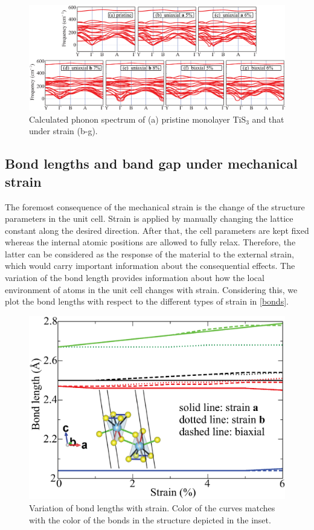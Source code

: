 \begin{landscape}
\begin{figure}[htb]
\centering
\includegraphics[width=\linewidth]{Mob_phn.eps}
\caption{Calculated phonon spectrum of (a) pristine monolayer TiS$_3$ and that under strain (b-g). }
\label{phn}
\end{figure}
\end{landscape}

\subsection{Bond lengths and band gap under mechanical strain}
The foremost consequence of the mechanical strain is the change of the structure parameters in the unit cell. Strain is applied by manually changing the lattice constant along the desired direction. After that, the cell parameters are kept fixed whereas the internal atomic positions are allowed to fully relax. Therefore, the latter can be considered as the response of the material to the external strain, which would carry important information about the consequential effects. The variation of the bond length provides information about how the local environment of atoms in the unit cell changes with strain. Considering this, we plot the bond lengths with respect to the different types of strain in \autoref{bonds}. 

\begin{figure}[htb]
\centering
\includegraphics[width=0.8\linewidth]{Mob_bonds.eps}
\caption{Variation of bond lengths with strain. Color of the curves matches with the color of the bonds in the structure depicted in the inset.\label{bonds}}
\end{figure}


